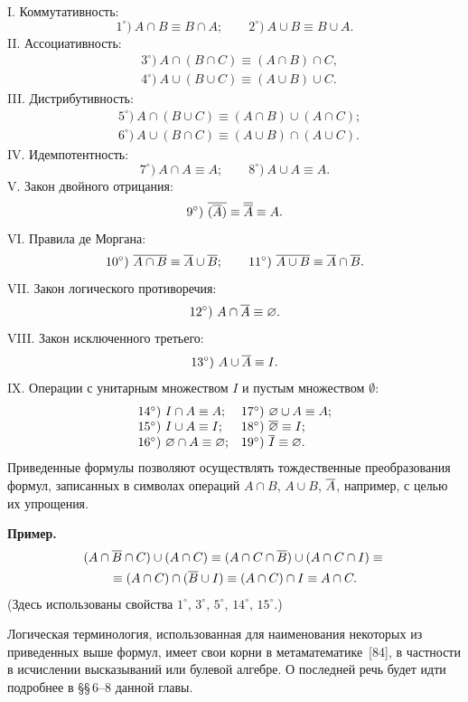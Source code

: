 I. Коммутативность:
\[
1^\circ)\ A\cap B\equiv B\cap A;\qquad 2^\circ)\ A\cup B\equiv B\cup A.
\]
II. Ассоциативность:
\[
\begin{aligned}
&3^\circ)\ A\cap(B\cap C)\equiv(A\cap B)\cap C,\\
&4^\circ)\ A\cup(B\cup C)\equiv(A\cup B)\cup C.
\end{aligned}
\]
%
III. Дистрибутивность:
\[
\begin{aligned}
&5^\circ)\ A\cap(B\cup C)\equiv(A\cap B)\cup(A\cap C);\\
&6^\circ)\ A\cup(B\cap C)\equiv(A\cup B)\cap(A\cup C).
\end{aligned}
\]
IV. Идемпотентность:
\[
7^\circ)\ A\cap A\equiv A;\qquad 8^\circ)\ A\cup A\equiv A.
\]
V. Закон двойного отрицания:
\[
9^\circ)\ \ov{(\ov A)}\equiv\ov{\ov A}\equiv A.
\]
VI. Правила де Моргана:
\[
10^\circ)\ \overline{A\cap B}\equiv\overline{A}\cup\overline{B};\qquad
11^\circ)\ \overline{A\cup B}\equiv\overline{A}\cap\overline{B}.
\]
VII. Закон логического противоречия:
\[
12^\circ)\ A\cap\ov A\equiv\emptyset.
\]
VIII. Закон исключенного третьего:
\[
13^\circ)\ A\cup\overline{A}\equiv I.
\]
IX. Операции с унитарным множеством $I$ и пустым множеством $\emptyset$:
\[
\begin{array}{ll}
14^\circ)\ I\cap A\equiv A; & 17^\circ)\ \varnothing\cup A\equiv A;\\
15^\circ)\ I\cup A\equiv I; & 18^\circ)\ \overline{\varnothing}\equiv I;\\
16^\circ)\ \varnothing\cap A\equiv\varnothing; & 19^\circ)\ \overline{I}\equiv\varnothing.
\end{array}
\]
Приведенные формулы позволяют осуществлять тождественные преобразования
формул, записанных в символах операций $A\cap B$, $A\cup B$, $\overline{A}$,
например, с целью их упрощения.

{\small\noindent\textbf{Пример.}
\begin{multline*}
(A\cap\overline{B}\cap C)\cup(A\cap C)\equiv(A\cap C\cap\overline{B})\cup(A\cap C\cap I)\equiv{}\\
\equiv(A\cap C)\cap(\overline{B}\cup I)\equiv(A\cap C)\cap I\equiv A\cap C.
\end{multline*}
(Здесь использованы свойства $1^\circ$, $3^\circ$, $5^\circ$, $14^\circ$,
$15^\circ$.)\par}

Логическая терминология, использованная для наименования некоторых из
приведенных выше формул, имеет свои корни в метаматематике~[84],
в частности в исчислении высказываний или булевой алгебре. О последней
речь будет идти подробнее в \S\S\,6--8 данной главы.


